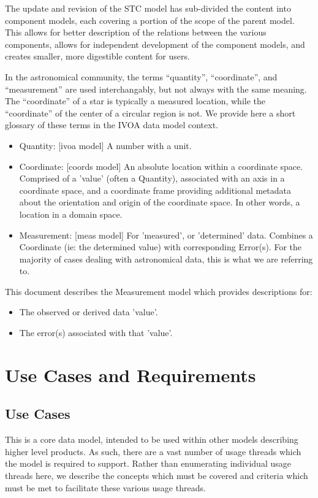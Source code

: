 \documentclass[11pt,a4paper]{ivoa}
\begin{document}
The update and revision of the STC model has sub-divided the content into component models, each covering a portion of the scope of the parent model.  This allows for better description of the relations between the various components, allows for independent development of the component models, and creates smaller, more digestible content for users.

In the astronomical community, the terms ``quantity'', ``coordinate'', and ``measurement'' are used interchangably, but not always with the same meaning.  The ``coordinate'' of a star is typically a measured location, while the ``coordinate'' of the center of a circular region is not.  We provide here a short glossary of these terms in the IVOA data model context.
\begin{itemize}
  \item Quantity: [ivoa model]  A number with a unit.
  \item Coordinate: [coords model]  An absolute location within a coordinate space.  Comprised of a 'value' (often a Quantity), associated with an axis in a coordinate space, and a coordinate frame providing additional metadata about the orientation and origin of the coordinate space.  In other words, a location in a domain space.
  \item Measurement: [meas model]  For 'measured', or 'determined' data.  Combines a Coordinate (ie: the determined value) with corresponding Error(s).  For the majority of cases dealing with astronomical data, this is what we are referring to.
\end{itemize}

This document describes the Measurement model which provides descriptions for:
\begin{itemize}
  \item The observed or derived data 'value'.
  \item The error(s) associated with that 'value'.
\end{itemize}

\section{Use Cases and Requirements}
\label{sect:ucreq}

\subsection{Use Cases}
\label{sect:usecases}

This is a core data model, intended to be used within other models describing higher level products.
As such, there are a vast number of usage threads which the model is required to support.  Rather than
enumerating individual usage threads here, we describe the concepts which must be covered and criteria
which must be met to facilitate these various usage threads.
\end{document}
